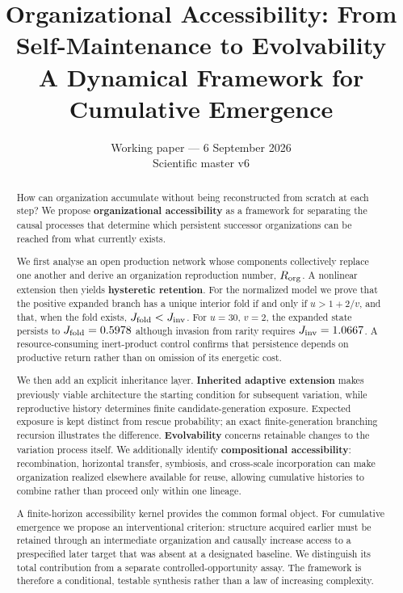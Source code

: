 \documentclass[11pt,a4paper]{article}
\title{\textbf{Organizational Accessibility: From Self-Maintenance to Evolvability}\\[0.5em]
\large A Dynamical Framework for Cumulative Emergence}
\author{} %
\date{Working paper --- 6 September 2026\\\small Scientific master v6}
\begin{document}
\maketitle

\begin{abstract}
How can organization accumulate without being reconstructed from scratch at each step? We propose \textbf{organizational accessibility} as a framework for separating the causal processes that determine which persistent successor organizations can be reached from what currently exists.

We first analyse an open production network whose components collectively replace one another and derive an organization reproduction number, $R_{\rm org}$. A nonlinear extension then yields \textbf{hysteretic retention}. For the normalized model we prove that the positive expanded branch has a unique interior fold if and only if $u>1+2/v$, and that, when the fold exists, $J_{\rm fold}<J_{\rm inv}$. For $u=30$, $v=2$, the expanded state persists to $J_{\rm fold}=0.5978$ although invasion from rarity requires $J_{\rm inv}=1.0667$. A resource-consuming inert-product control confirms that persistence depends on productive return rather than on omission of its energetic cost.

We then add an explicit inheritance layer. \textbf{Inherited adaptive extension} makes previously viable architecture the starting condition for subsequent variation, while reproductive history determines finite candidate-generation exposure. Expected exposure is kept distinct from rescue probability; an exact finite-generation branching recursion illustrates the difference. \textbf{Evolvability} concerns retainable changes to the variation process itself. We additionally identify \textbf{compositional accessibility}: recombination, horizontal transfer, symbiosis, and cross-scale incorporation can make organization realized elsewhere available for reuse, allowing cumulative histories to combine rather than proceed only within one lineage.

A finite-horizon accessibility kernel provides the common formal object. For cumulative emergence we propose an interventional criterion: structure acquired earlier must be retained through an intermediate organization and causally increase access to a prespecified later target that was absent at a designated baseline. We distinguish its total contribution from a separate controlled-opportunity assay. The framework is therefore a conditional, testable synthesis rather than a law of increasing complexity.
\end{abstract}
\end{document}
